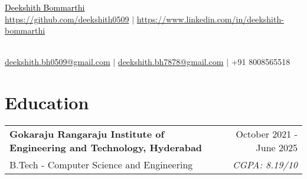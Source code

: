 \documentclass[a4paper,10pt]{article}
\newcommand{\sectionheader}[2]{%
    \begin{center}
        \textcolor{myblue}{\Huge #1} \\[6pt]
        \textcolor{mydarkblue}{\raisebox{-0.05\height}{\faGithub} \href{#2}{https://github.com/deekshith0509}} $|$
        \textcolor{mydarkblue}{\raisebox{-0.05\height}{\faLinkedin} \href{https://www.linkedin.com/in/deekshith-bommarthi}{https://www.linkedin.com/in/deekshith-bommarthi}}
    \end{center}
}
\begin{document}
\begin{center}
    \parbox{\linewidth}{%
        \centering
        \sectionheader{\href{https://deekshith0509.github.io/Portfolio.html}{\textcolor{black}{Deekshith Bommarthi}}}{https://github.com/deekshith0509/} \\[2pt]
        \textcolor{mydarkblue}{\raisebox{-0.05\height}{\faEnvelope} \href{mailto:deekshith.bh0509@gmail.com}{deekshith.bh0509@gmail.com}} $|$
        \textcolor{mydarkblue}{\href{mailto:deekshith.bh7878@gmail.com}{deekshith.bh7878@gmail.com}} $|$
        \textcolor{mydarkblue}{\raisebox{-0.05\height}{\faMobile} +91 8008565518} \\
    }
\end{center}


\section*{Education}
\vspace{5pt}

\begin{tabularx}{\linewidth}{@{} l r @{}}
    \color{myblue} \textbf{Gokaraju Rangaraju Institute of Engineering and Technology, Hyderabad} & \hspace{3.5cm}  \color{mydarkblue} October 2021 - June 2025 \\[1pt] %
    \color{mydarkblue} B.Tech - Computer Science and Engineering &  \vspace{-10pt}\color{mylightpurple} \textit{CGPA: 8.19/10} \\[10pt] %

\end{tabularx}


\newcommand{\skillsentry}[2]{%
    \textcolor{myblue}{\textbf{#1}} & \textcolor{mydarkblue}{#2} \\
}
\newcommand{\skillsentry}[2]{%
    \textcolor{myblue}{\textbf{#1}} & \textcolor{mydarkblue}{#2} \\
}
\vspace{-3pt}
\end{document}

